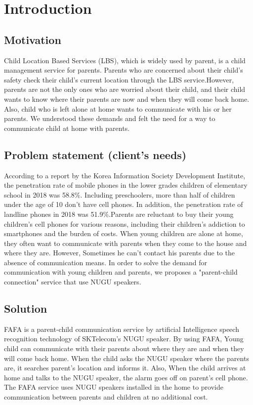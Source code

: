 \documentclass[conference]{IEEEtran}
\begin{document}
\section{Introduction}
\subsection{Motivation}
Child Location Based Services (LBS), which is widely used by parent, is a child management service for parents. Parents who are concerned about their child’s safety check their child's current location through the LBS service.However, parents are not the only ones who are worried about their child, and their child wants to know where their parents are now and when they will come back home. Also, child who is left alone at home wants to communicate with his or her parents. We understood these demands and felt the need for a way to communicate child at home with parents.

\subsection{Problem statement (client’s needs)}
According to a report by the Korea Information Society Development Institute, the penetration rate of mobile phones in the lower grades children of elementary school in 2018 was 58.8\%. Including preschoolers, more than half of children under the age of 10 don't have cell phones. In addition, the penetration rate of landline phones in 2018 was 51.9\%.Parents are reluctant to buy their young children's cell phones for various reasons, including their children's addiction to smartphones and the burden of costs. When young children are alone at home, they often want to communicate with parents when they come to the house and where they are. However, Sometimes he can’t contact his parents due to the absence of communication means. In order to solve the demand for communication with young children and parents, we proposes a "parent-child connection" service that use NUGU speakers.

\subsection{Solution}
FAFA is a parent-child communication service by artificial Intelligence speech recognition technology of SKTelecom’s NUGU speaker. By using FAFA, Young child can communicate with their parents about where they are and when they will come back home. When the child asks the NUGU speaker where the parents are, it searches parent’s location and informs it. Also, When the child arrives at home and talks to the NUGU speaker, the alarm goes off on parent’s cell phone. The FAFA service uses NUGU speakers installed in the home to provide communication between parents and children at no additional cost.
\end{document}
